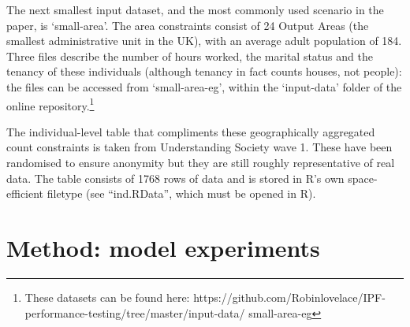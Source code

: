 \documentclass[a4paper,10pt]{article}
\begin{document}
The next smallest input dataset, and the most commonly used scenario in the paper, 
is `small-area'. The area constraints consist of 24 Output Areas (the smallest 
administrative unit in the UK), with an average adult population of 184.
Three files describe the number of hours worked, the marital status and the
tenancy of these 
individuals (although tenancy in fact counts houses, not people): the files can
be accessed from `small-area-eg', within the `input-data' folder of the online
repository.\footnote{These datasets can be found here:
https://github.com/Robinlovelace/IPF-performance-testing/tree/master/input-data/
small-area-eg}
% 

The individual-level table that compliments these geographically aggregated count constraints 
is taken from Understanding Society wave 1. These have been randomised to ensure anonymity
but they are still roughly representative of real data. The table consists of 1768 rows of 
data and is stored in R’s own space-efficient filetype (see ``ind.RData'', which must be opened in 
R).




\section{Method: model experiments}
\end{document}

